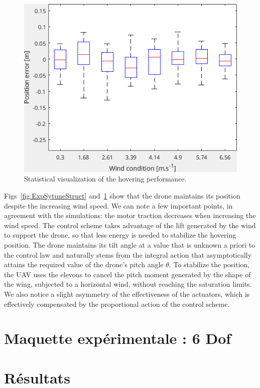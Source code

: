 \begin{figure}[ht]
    \centering
    \includegraphics[trim=0cm 0cm 0cm 0cm,clip,width=0.9\columnwidth]{figures/boxplot.png}
    \caption{Statistical visualization of the hovering performance.}
    \label{fig:statpos}
\end{figure}
Figs~\ref{fig:ExpSytuneStruct} and~\ref{fig:statpos} show that the drone maintains its position despite the increasing wind speed. We can note a few important points, in agreement with the simulations: the motor traction decreases when increasing the wind speed. The control scheme takes advantage of the lift generated by the wind to support the drone, so that less energy is needed to stabilize the hovering position. The drone maintains its tilt angle at a value that is unknown a priori to the control law and naturally stems from the integral action that asymptotically attains the required value of the drone's pitch angle $\theta$. To stabilize the position, the UAV uses the elevons to cancel the pitch moment generated by the shape of the wing, subjected to a horizontal wind, without reaching the saturation limits.
We also notice a slight asymmetry of the effectiveness of the actuators, which is effectively compensated by the proportional action of the control scheme.
\section{Maquette expérimentale : 6 Dof}

\section{Résultats}






